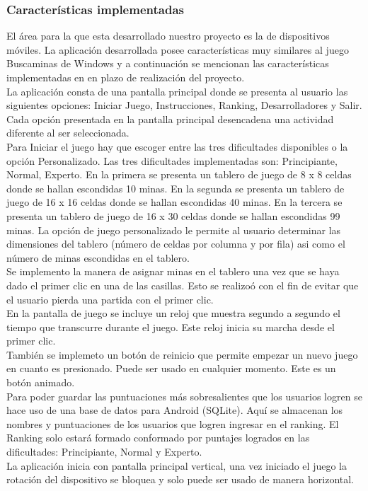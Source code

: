 \documentclass[11pt]{article} %
\begin{document}
\subsubsection{\textbf{Caracter\' isticas implementadas}}
El \'area para la que esta desarrollado nuestro proyecto es la de dispositivos m\'oviles.
La aplicaci\'on desarrollada posee caracter\'isticas muy similares al juego Buscaminas de Windows y a continuaci\'on se mencionan las caracter\'isticas implementadas en en plazo de realizaci\'on del proyecto.
\\La aplicaci\'on consta de una pantalla principal  donde se presenta al usuario las siguientes opciones: Iniciar Juego, Instrucciones, Ranking, Desarrolladores y Salir. Cada opci\'on presentada en la pantalla principal desencadena una actividad diferente al ser seleccionada.
\\Para Iniciar el juego hay que escoger entre las tres dificultades disponibles o la opci\'on Personalizado. Las tres dificultades implementadas son: Principiante, Normal, Experto. En la primera se presenta un tablero de juego de 8 x 8 celdas donde se hallan escondidas 10 minas. En la segunda se presenta un tablero de juego de 16 x 16 celdas donde se hallan escondidas 40 minas. En la tercera se presenta un tablero de juego de 16 x 30 celdas donde se hallan escondidas 99 minas. La opci\'on de juego personalizado le permite al usuario determinar las dimensiones del tablero (n\'umero de celdas por columna y por fila) asi como el n\'umero de minas escondidas en el tablero.
\\Se implemento la manera de asignar minas en el tablero una vez que se haya dado el primer clic en una de las casillas. Esto se realizo\' o con el fin de evitar que el usuario pierda una partida con el primer clic.
\\En la pantalla de juego se incluye un reloj que muestra segundo a segundo el tiempo que transcurre durante el juego. Este reloj inicia su marcha desde el primer clic.
\\Tambi\'en se implemeto un bot\' on de reinicio que permite empezar un nuevo juego en cuanto es presionado. Puede ser usado en cualquier momento. Este es un bot\'on animado.
\\Para poder guardar las puntuaciones m\' as sobresalientes que los usuarios logren se hace uso de una base de datos para Android (SQLite). Aqu\' i se almacenan los nombres y puntuaciones de los usuarios que logren ingresar en el ranking. El Ranking solo estar\'a formado  conformado por puntajes logrados en las dificultades: Principiante, Normal y Experto.
\\La aplicaci\'on inicia con pantalla principal vertical, una vez iniciado el juego la rotaci\'on del dispositivo se bloquea y solo puede ser usado de manera horizontal.
\end{document}
